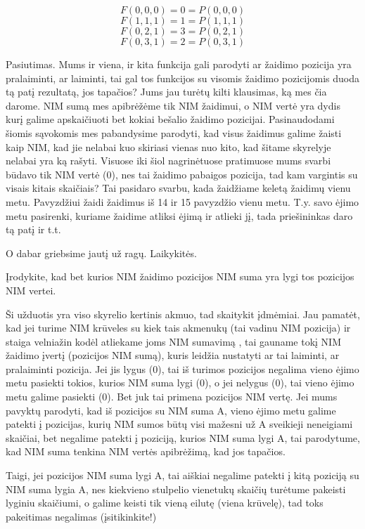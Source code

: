 $$F(0,0,0)=0=P(0,0,0)$$
$$F(1,1,1)=1=P(1,1,1)$$ 
$$F(0,2,1)=3=P(0,2,1)$$
$$F(0,3,1)=2=P(0,3,1)$$

Pasiutimas. Mums ir viena, ir kita funkcija gali parodyti ar žaidimo pozicija yra pralaiminti, ar laiminti, tai gal tos funkcijos su visomis žaidimo pozicijomis duoda tą patį rezultatą, jos tapačios? Jums jau turėtų kilti klausimas, ką mes čia darome. NIM sumą mes apibrėžėme tik NIM žaidimui, o NIM vertė yra dydis kurį galime apskaičiuoti bet kokiai bešalio žaidimo pozicijai. Pasinaudodami šiomis sąvokomis mes pabandysime parodyti, kad visus žaidimus galime žaisti kaip NIM, kad jie nelabai kuo skiriasi vienas nuo kito, kad šitame skyrelyje nelabai yra ką rašyti. Visuose iki šiol nagrinėtuose pratimuose mums svarbi būdavo tik NIM vertė (0), nes tai žaidimo pabaigos pozicija, tad kam vargintis su visais kitais skaičiais? Tai pasidaro svarbu, kada žaidžiame keletą žaidimų vienu metu. Pavyzdžiui žaidi žaidimus iš 14 ir 15 pavyzdžio vienu metu. T.y. savo ėjimo metu pasirenki, kuriame žaidime atliksi ėjimą ir atlieki jį, tada priešininkas daro tą  patį ir t.t. 

O dabar griebsime jautį už ragų. Laikykitės. 

\begin{pavnr} Įrodykite, kad bet kurios NIM žaidimo pozicijos NIM suma yra lygi tos pozicijos NIM vertei.
\end{pavnr} 

Ši užduotis yra viso skyrelio kertinis akmuo, tad skaitykit įdmėmiai. Jau pamatėt, kad jei turime NIM krūveles su kiek tais akmenukų (tai vadinu NIM pozicija) ir staiga velniažin kodėl atliekame joms NIM sumavimą , tai gauname tokį NIM žaidimo įvertį (pozicijos NIM sumą), kuris leidžia nustatyti ar tai laiminti, ar pralaiminti pozicija. Jei jis lygus (0), tai iš turimos pozicijos negalima vieno ėjimo metu pasiekti tokios, kurios NIM suma lygi (0), o jei nelygus (0), tai vieno ėjimo metu galime pasiekti (0). Bet juk tai primena pozicijos NIM vertę. Jei mums pavyktų parodyti, kad iš pozicijos su NIM suma A, vieno ėjimo metu galime patekti į pozicijas, kurių NIM sumos būtų visi mažesni už A sveikieji neneigiami skaičiai, bet negalime patekti į poziciją, kurios NIM suma lygi A, tai parodytume, kad NIM suma tenkina NIM vertės apibrėžimą, kad jos tapačios. 

Taigi, jei pozicijos NIM suma lygi A, tai aiškiai negalime patekti į kitą poziciją su NIM suma lygia A, nes kiekvieno stulpelio vienetukų skaičių turėtume pakeisti lyginiu skaičiumi, o galime keisti tik vieną eilutę (viena krūvelę), tad toks pakeitimas negalimas (įsitikinkite!) 

